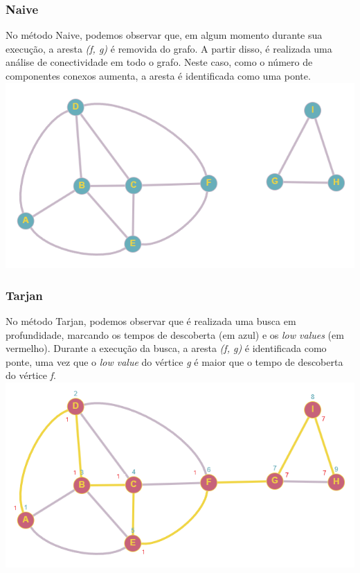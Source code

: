 \documentclass{sbc2023}%
\begin{document}
\subsubsection{Naive}
No método Naive, podemos observar que, em algum momento durante sua execução, a aresta \textit{(f, g)} é removida do grafo. A partir disso, é realizada uma análise de conectividade em todo o grafo. Neste caso, como o número de componentes conexos aumenta, a aresta é identificada como uma ponte. \includegraphics[width=\columnwidth]{grafo_naive.png}

\subsubsection{Tarjan}
No método Tarjan, podemos observar que é realizada uma busca em profundidade, marcando os tempos de descoberta (em azul) e os \textit{low values} (em vermelho). Durante a execução da busca, a aresta \textit{(f, g)} é identificada como ponte, uma vez que o \textit{low value} do vértice \textit{g} é maior que o tempo de descoberta do vértice \textit{f}.
\includegraphics[width=\columnwidth]{grafo_tarjan-2.png}
\end{document}
